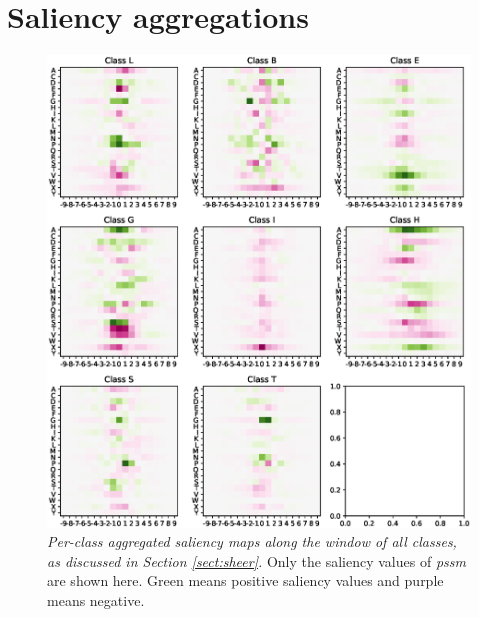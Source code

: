 \chapter{Saliency aggregations} \label{Chapter:App}
\begin{figure}
\centering
\includegraphics[width=0.85\linewidth]{Figures/class_agg_class_all}
\caption{\textit{Per-class aggregated saliency maps along the window of all classes, as discussed in Section \ref{sect:sheer}.} Only the saliency values of \textit{pssm} are shown here. Green means positive saliency values and purple means negative.}
\label{fig:class_agg_class_all}
\end{figure}

